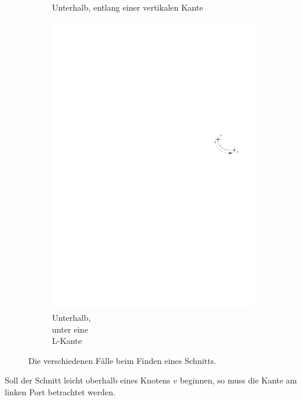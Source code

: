 \documentclass[a4paper]{scrreprt}
\theoremstyle{definition}
\begin{document}
\begin{figure}[h]
\begin{subfigure}[b]{0.2\textwidth}
                \caption{Unterhalb, entlang einer vertikalen Kante}
                \label{fig:cutfinding_bot_vertical}
        \end{subfigure}
        \quad
        \begin{subfigure}[b]{0.2\textwidth}
                \includegraphics[width=\textwidth]{schnitt_finden/bot_belowL}
                \caption{Unterhalb, \\ unter eine \\ L-Kante}
                \label{fig:cutfinding_bot_belowL}
        \end{subfigure}
        \caption{Die verschiedenen Fälle beim Finden eines Schnitts.}\label{fig:cutfinding}
\end{figure}


Soll der Schnitt leicht oberhalb eines Knotens $v$ beginnen, so muss die Kante am linken Port betrachtet werden.
\end{document}
